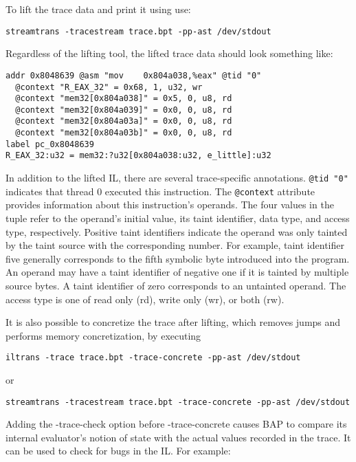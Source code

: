 To lift the trace data and print it using  use:

\begin{verbatim}
streamtrans -tracestream trace.bpt -pp-ast /dev/stdout
\end{verbatim}

Regardless of the lifting tool, the lifted trace data should look
something like:

\begin{verbatim}
addr 0x8048639 @asm "mov    0x804a038,%eax" @tid "0"
  @context "R_EAX_32" = 0x68, 1, u32, wr
  @context "mem32[0x804a038]" = 0x5, 0, u8, rd
  @context "mem32[0x804a039]" = 0x0, 0, u8, rd
  @context "mem32[0x804a03a]" = 0x0, 0, u8, rd
  @context "mem32[0x804a03b]" = 0x0, 0, u8, rd
label pc_0x8048639
R_EAX_32:u32 = mem32:?u32[0x804a038:u32, e_little]:u32
\end{verbatim}

In addition to the lifted IL, there are several trace-specific
annotations.  \texttt{@tid "0"} indicates that thread 0 executed this
instruction.  The \texttt{@context} attribute provides information
about this instruction's operands.  The four values in the tuple refer
to the operand's initial value, its taint identifier, data type, and
access type, respectively.  Positive taint identifiers indicate the
operand was only tainted by the taint source with the corresponding
number.  For example, taint identifier five generally corresponds to
the fifth symbolic byte introduced into the program.  An operand may
have a taint identifier of negative one if it is tainted by multiple
source bytes.  A taint identifier of zero corresponds to an untainted
operand.  The access type is one of read only (rd), write only (wr),
or both (rw).

It is also possible to concretize the trace after lifting, which
removes jumps and performs memory concretization, by executing

\begin{verbatim}
iltrans -trace trace.bpt -trace-concrete -pp-ast /dev/stdout
\end{verbatim}
or
\begin{verbatim}
streamtrans -tracestream trace.bpt -trace-concrete -pp-ast /dev/stdout
\end{verbatim}

Adding the -trace-check option before -trace-concrete causes BAP to
compare its internal evaluator's notion of state with the actual
values recorded in the trace.  It can be used to check for bugs in the
IL.  For example:


